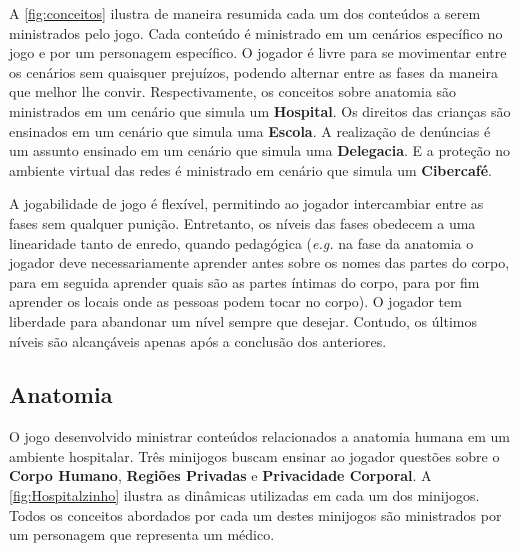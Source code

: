 A \autoref{fig:conceitos} ilustra de maneira resumida cada um dos conteúdos a serem ministrados pelo jogo. Cada conteúdo é ministrado em um cenários específico no jogo e por um personagem específico. O jogador é livre para se movimentar entre os cenários sem quaisquer prejuízos, podendo alternar entre as fases da maneira que melhor lhe convir. Respectivamente, os conceitos sobre anatomia são ministrados em um cenário que simula um \textbf{Hospital}. Os direitos das crianças são ensinados em um cenário que simula uma \textbf{Escola}. A realização de denúncias é um assunto ensinado em um cenário que simula uma \textbf{Delegacia}. E a proteção no ambiente virtual das redes é ministrado em cenário que simula um \textbf{Cibercafé}.

A jogabilidade de jogo é flexível, permitindo ao jogador intercambiar entre as fases sem qualquer punição. Entretanto, os níveis das fases obedecem a uma linearidade tanto de enredo, quando pedagógica (\textit{e.g.} na fase da anatomia o jogador deve necessariamente aprender antes sobre os nomes das partes do corpo, para em seguida aprender quais são as partes íntimas do corpo, para por fim aprender os locais onde as pessoas podem tocar no corpo). O jogador tem liberdade para abandonar um nível sempre que desejar. Contudo, os últimos níveis são alcançáveis apenas após a conclusão dos anteriores. 


\subsection{Anatomia}\label{subsec:1}

O jogo desenvolvido ministrar conteúdos relacionados a anatomia humana em um ambiente hospitalar. Três minijogos buscam ensinar ao jogador questões sobre o \textbf{Corpo Humano}, \textbf{Regiões Privadas} e \textbf{Privacidade Corporal}. A \autoref{fig:Hospitalzinho} ilustra as dinâmicas utilizadas em cada um dos minijogos. Todos os conceitos abordados por cada um destes minijogos são ministrados por um personagem que representa um médico. 

